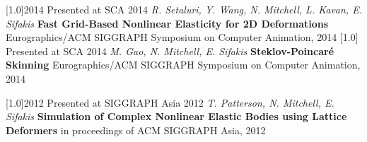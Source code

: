 \documentclass{cv-style}     %
\begin{document}
\begin{entrylist}
\entry
{\scalebox{.8}[1.0]{2014}}
{}
{Presented at SCA 2014}
{\textit{R. Setaluri, Y. Wang, N. Mitchell, L. Kavan,
E. Sifakis}  \textbf{Fast Grid-Based Nonlinear Elasticity
for 2D Deformations}  Eurographics/ACM SIGGRAPH
Symposium on Computer Animation, 2014}
\entry
{\scalebox{.8}[1.0]{}}
{}
{Presented at SCA 2014}
{\textit{M. Gao, N. Mitchell, E. Sifakis}  \textbf{Steklov-Poincar\'{e}
Skinning}  Eurographics/ACM SIGGRAPH Symposium on
Computer Animation, 2014}
\end{entrylist}
\begin{entrylist}
\entry
{\scalebox{.8}[1.0]{2012}}
{}
{Presented at SIGGRAPH Asia 2012}
{\textit{T. Patterson, N. Mitchell, E. Sifakis}  \textbf{Simulation
of Complex Nonlinear Elastic Bodies using Lattice
Deformers}  in proceedings of ACM SIGGRAPH Asia,
2012}
\end{entrylist}
  \vspace{-0.2cm}
\end{document}
